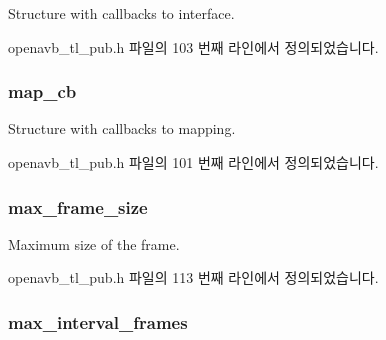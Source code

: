 Structure with callbacks to interface. 



openavb\+\_\+tl\+\_\+pub.\+h 파일의 103 번째 라인에서 정의되었습니다.

\subsubsection[{\texorpdfstring{map\+\_\+cb}{map_cb}}]{ map\+\_\+cb}\hypertarget{structopenavb__tl__cfg__t_a0a631fd45cd5f56f47a927e435f21a38}{}\label{structopenavb__tl__cfg__t_a0a631fd45cd5f56f47a927e435f21a38}


Structure with callbacks to mapping. 



openavb\+\_\+tl\+\_\+pub.\+h 파일의 101 번째 라인에서 정의되었습니다.

\subsubsection[{\texorpdfstring{max\+\_\+frame\+\_\+size}{max_frame_size}}]{ max\+\_\+frame\+\_\+size}\hypertarget{structopenavb__tl__cfg__t_ac2af862bb15aba31178c61c260f5c54b}{}\label{structopenavb__tl__cfg__t_ac2af862bb15aba31178c61c260f5c54b}


Maximum size of the frame. 



openavb\+\_\+tl\+\_\+pub.\+h 파일의 113 번째 라인에서 정의되었습니다.

\subsubsection[{\texorpdfstring{max\+\_\+interval\+\_\+frames}{max_interval_frames}}]{ max\+\_\+interval\+\_\+frames}\hypertarget{structopenavb__tl__cfg__t_abf63c5094d06b48eb2da41a9cf3e1d00}{}\label{structopenavb__tl__cfg__t_abf63c5094d06b48eb2da41a9cf3e1d00}


